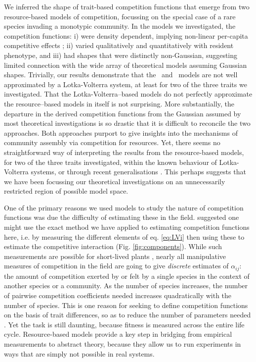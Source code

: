 \documentclass[a4paper,11pt]{article}
\begin{document}
We inferred the shape of trait-based competition functions that emerge
from two resource-based models of competition, focussing on the
special case of a rare species invading a monotypic community.
%
In the models we investigated, the competition functions: i) were
density dependent, implying non-linear per-capita competitive effects
\citep{Abrams-1980}; ii) varied qualitatively and quantitatively with
resident phenotype,
and iii) had shapes that were distinctly non-Gaussian, suggesting
limited connection with the wide array of theoretical models assuming
Gaussian shapes.
%
Trivially, our results demonstrate that the \Rstar\ and \plant\ models
are not well approximated by a Lotka-Volterra system, at least for two
of the three traits we investigated. That the Lotka-Volterra--based
models do not perfectly approximate the resource--based models in
itself is not surprising.
%
More substantially, the departure in the derived competition functions
from the Gaussian assumed by most theoretical investigations
is so drastic that it is difficult to reconcile the two approaches.
Both approaches purport to give insights into the mechanisms of
community assembly via competition for resources.  Yet, there seems no
straightforward way of interpreting the results from the
resource-based models, for two of the three traits investigated,
within the known behaviour of Lotka-Volterra systems, or through
recent generalisations \citep{Leimar-2013}. This perhaps suggests that
we have been focussing our theoretical investigations on an
unnecessarily restricted region of possible model space.


One of the primary reasons we used models to study the nature of
competition functions was due the difficulty of estimating these in
the field. \citet{Ricklefs-1973} suggested one might use
the exact method we have
applied to estimating competition functions here, i.e. by measuring the
different elements of eq. \ref{eq:LVi} then using these to estimate
the competitive interaction (Fig. \ref{fig:components}).  While
such measurements are possible for short-lived plants
\citep{Kraft-2015}, nearly all manipulative measures of competition in
the field are going to give \emph{discrete} estimates of $\alpha_{ij}$: the
amount of competition exerted by or felt by a single species in the
context of another species or a community. As the number of species
increases, the number of pairwise competition coefficients needed
increases quadratically with the number of species. This is one reason
for seeking to define competition functions on the basis of trait
differences, so as to reduce the number of parameters needed
\citep{Kraft-2015}. Yet the task is still daunting, because fitness is measured
across the entire life cycle.  Resource-based models provide a key step in
bridging from empirical measurements to abstract theory, because they
allow us to run experiments in ways that are simply not possible in real systems.
\end{document}

